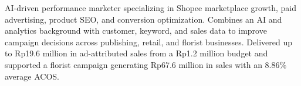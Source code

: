 AI-driven performance marketer specializing in Shopee marketplace growth, paid advertising, product SEO, and conversion optimization. Combines an AI and analytics background with customer, keyword, and sales data to improve campaign decisions across publishing, retail, and florist businesses. Delivered up to Rp19.6 million in ad-attributed sales from a Rp1.2 million budget and supported a florist campaign generating Rp67.6 million in sales with an 8.86\% average ACOS.
